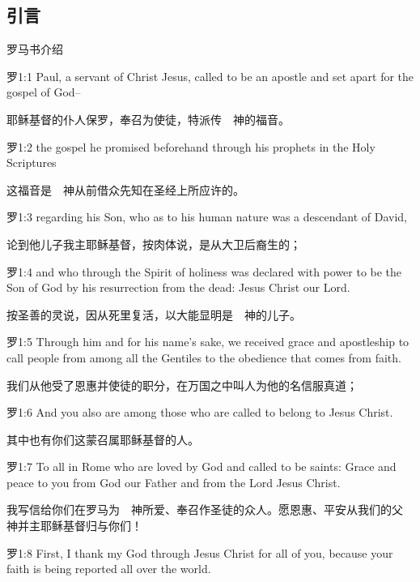 \documentclass[a4paper,11pt,onecolumn,twoside]{ctexart}
\begin{document}
\begin{multicols}{2}
\section{引言}
罗马书介绍

 罗1:1
 Paul, a servant of Christ Jesus, called to be an apostle and set apart for the gospel of God--

 耶稣基督的仆人保罗，奉召为使徒，特派传　神的福音。


 罗1:2
 the gospel he promised beforehand through his prophets in the Holy Scriptures

 这福音是　神从前借众先知在圣经上所应许的。


 罗1:3
 regarding his Son, who as to his human nature was a descendant of David,

 论到他儿子我主耶稣基督，按肉体说，是从大卫后裔生的；


 罗1:4
 and who through the Spirit of holiness was declared with power to be the Son of God by his resurrection from the dead: Jesus Christ our Lord.

 按圣善的灵说，因从死里复活，以大能显明是　神的儿子。


 罗1:5
 Through him and for his name's sake, we received grace and apostleship to call people from among all the Gentiles to the obedience that comes from faith.

 我们从他受了恩惠并使徒的职分，在万国之中叫人为他的名信服真道；


 罗1:6
 And you also are among those who are called to belong to Jesus Christ.

 其中也有你们这蒙召属耶稣基督的人。


 罗1:7
 To all in Rome who are loved by God and called to be saints: Grace and peace to you from God our Father and from the Lord Jesus Christ.

 我写信给你们在罗马为　神所爱、奉召作圣徒的众人。愿恩惠、平安从我们的父　神并主耶稣基督归与你们！


 罗1:8
 First, I thank my God through Jesus Christ for all of you, because your faith is being reported all over the world.


\end{multicols}
\end{document}
